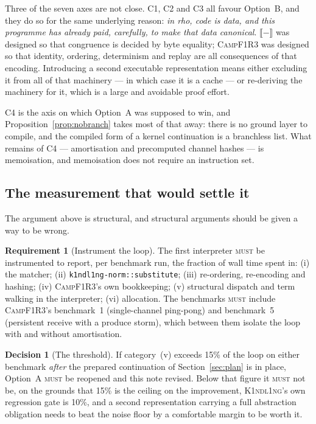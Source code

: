 \documentclass[11pt,a4paper]{article}
\newcommand{\code}[1]{\texttt{#1}}
\newcommand{\Kind}{\textsc{K1ndl1ng}}
\newcommand{\Camp}{\textsc{CampF1R3}}
\newcommand{\MUST}{\textsc{must}}
\newcommand{\enc}[1]{\llbracket #1 \rrbracket}
\theoremstyle{definition}
\newtheorem{requirement}[definition]{Requirement}
\newtheorem{decision}[definition]{Decision}
\theoremstyle{plain}
\begin{document}
Three of the seven axes are not close. C1, C2 and C3 all favour Option~B, and
they do so for the same underlying reason: \emph{in rho, code is data, and this
programme has already paid, carefully, to make that data canonical}. $\enc{-}$
was designed so that congruence is decided by byte equality; \Camp{} was
designed so that identity, ordering, determinism and replay are all consequences
of that encoding. Introducing a second executable representation means either
excluding it from all of that machinery --- in which case it is a cache --- or
re-deriving the machinery for it, which is a large and avoidable proof effort.

C4 is the axis on which Option~A was supposed to win, and
Proposition~\ref{prop:nobranch} takes most of that away: there is no ground
layer to compile, and the compiled form of a kernel continuation is a branchless
list. What remains of C4 --- amortisation and precomputed channel hashes --- is
memoisation, and memoisation does not require an instruction set.

\subsection{The measurement that would settle it}\label{sec:measure}

The argument above is structural, and structural arguments should be given a
way to be wrong.

\begin{requirement}[Instrument the loop]\label{req:measure}
The first interpreter \MUST{} be instrumented to report, per benchmark run, the
fraction of wall time spent in: (i) the matcher; (ii)
\code{k1ndl1ng-norm::substitute}; (iii) re-ordering, re-encoding and hashing;
(iv) \Camp's own bookkeeping; (v) structural dispatch and term walking in the
interpreter; (vi) allocation. The benchmarks \MUST{} include \Camp's
benchmark~1 (single-channel ping-pong) and benchmark~5 (persistent receive with
a produce storm), which between them isolate the loop with and without
amortisation.
\end{requirement}

\begin{decision}[The threshold]\label{dec:threshold}
If category~(v) exceeds 15\% of the loop on either benchmark \emph{after} the
prepared continuation of Section~\ref{sec:plan} is in place, Option~A \MUST{} be
reopened and this note revised. Below that figure it \MUST{} not be, on the
grounds that 15\% is the ceiling on the improvement, \Kind's own regression gate
is 10\%, and a second representation carrying a full abstraction obligation
needs to beat the noise floor by a comfortable margin to be worth it.
\end{decision}
\end{document}
